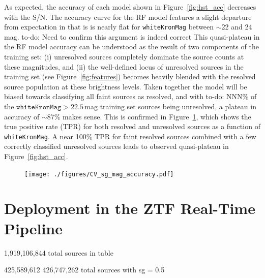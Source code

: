 \documentclass[twocolumn]{aastex63}
\newcommand{\todo}[1]{{\color{magenta} to-do: {#1}}}
\begin{document}
As expected, the accuracy of each model shown in Figure~\ref{fig:hst_acc}
decreases with the S/N. The accuracy curve for the RF model features a slight
departure from expectation in that is is nearly flat for \texttt{whiteKronMag}
between $\sim$22 and 24\,mag. \todo{Need to confirm this argument is indeed
correct} This quasi-plateau in the RF model accuracy can be understood as the
result of two components of the training set: (i) unresolved sources
completely dominate the source counts at these magnitudes, and (ii) the
well-defined locus of unresolved sources in the training set (see
Figure~\ref{fig:features}) becomes heavily blended with the resolved source
population at these brightness levels. Taken together the model will be biased
towards classifying all faint sources as resolved, and with \todo{NNN}\% of
the $\mathtt{whiteKronMag} > 22.5$\,mag training set sources being unresolved,
a plateau in accuracy of $\sim$87\% makes sense. This is confirmed in
Figure~\ref{fig:sg_accuracy}, which shows the true positive rate (TPR) for
both resolved and unresolved sources as a function of \texttt{whiteKronMag}. A
near 100\% TPR for faint resolved sources combined with a few correctly
classified unresolved sources leads to observed quasi-plateau in
Figure~\ref{fig:hst_acc}.

\begin{figure}
    \centering
    \texttt{[image: ./figures/CV\_sg\_mag\_accuracy.pdf]}
    \caption{}
    \label{fig:sg_accuracy}
\end{figure}    

\section{Deployment in the ZTF Real-Time Pipeline}\label{sec:discussion}

1,919,106,844 total sources in table

425,589,612 
426,747,262 total sources with sg = 0.5

\acknowledgments

\vspace{5mm}
\facilities{}


\software{}



\end{document}
